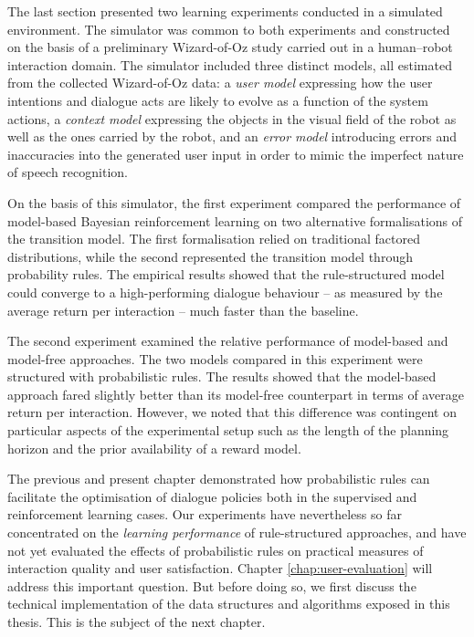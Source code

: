 The last section presented two learning experiments conducted in a simulated environment.  The simulator was common to both experiments and constructed on the basis of a preliminary Wizard-of-Oz study carried out in a human--robot interaction domain. The simulator included three distinct models, all estimated from the collected Wizard-of-Oz data: a \textit{user model} expressing how the user intentions and dialogue acts are likely to evolve as a function of the system actions, a \textit{context model} expressing the objects in the visual field of the robot as well as the ones carried by the robot, and an \textit{error model} introducing errors and inaccuracies into the generated user input in order to mimic the imperfect nature of speech recognition.

On the basis of this simulator, the first experiment compared the performance of model-based Bayesian reinforcement learning on two alternative formalisations of the transition model.  The first formalisation relied on traditional factored distributions, while the second represented the transition model through probability rules. The empirical results showed that the rule-structured model could converge to a high-performing dialogue behaviour -- as measured by the average return per interaction -- much faster than the baseline.

The second experiment examined the relative performance of model-based and model-free approaches.  The two models compared in this experiment were structured with probabilistic rules. The results showed that the model-based approach fared slightly better than its model-free counterpart in terms of average return per interaction.  However, we noted that this difference was contingent on particular aspects of the experimental setup such as the length of the planning horizon and the prior availability of a reward model. 

The previous and present chapter demonstrated how probabilistic rules can facilitate the optimisation of dialogue policies both in the supervised and reinforcement learning cases. Our experiments have nevertheless so far concentrated on the \textit{learning performance} of rule-structured approaches, and have not yet evaluated the effects of probabilistic rules on practical measures of interaction quality and user satisfaction. Chapter \ref{chap:user-evaluation} will address this important question. But before doing so, we first discuss the technical implementation of the data structures and algorithms exposed in this thesis. This is the subject of the next chapter.